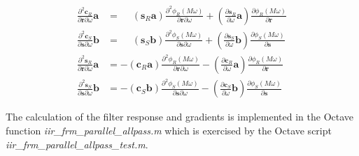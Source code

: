 \documentclass[a4paper,twoside,10pt,english]{report}
\begin{document}
\begin{align*}
\frac{\partial^{2}\boldsymbol{c}_{R}}{\partial\boldsymbol{r}\partial\omega}
\boldsymbol{a}&=
\phantom{-}\left(\boldsymbol{s}_{R}\boldsymbol{a}\right)
\frac{\partial^{2}\phi_{R}\left(M\omega\right)}
{\partial\boldsymbol{r}\partial\omega}
+\left(\frac{\partial\boldsymbol{s}_{R}}{\partial\omega}\boldsymbol{a}\right)
\frac{\partial\phi_{R}\left(M\omega\right)}{\partial\boldsymbol{r}}\\
\frac{\partial^{2}\boldsymbol{c}_{S}}{\partial\boldsymbol{s}\partial\omega}
\boldsymbol{b}&=
\phantom{-}\left(\boldsymbol{s}_{S}\boldsymbol{b}\right)
\frac{\partial^{2}\phi_{S}\left(M\omega\right)}
{\partial\boldsymbol{s}\partial\omega}
+\left(\frac{\partial\boldsymbol{s}_{S}}{\partial\omega}\boldsymbol{b}\right)
\frac{\partial\phi_{S}\left(M\omega\right)}{\partial\boldsymbol{s}}\\
\frac{\partial^{2}\boldsymbol{s}_{R}}{\partial\boldsymbol{r}\partial\omega}
\boldsymbol{a}&= 
-\left(\boldsymbol{c}_{R}\boldsymbol{a}\right)
\frac{\partial^{2}\phi_{R}\left(M\omega\right)}
{\partial\boldsymbol{r}\partial\omega}
-\left(\frac{\partial\boldsymbol{c}_{R}}{\partial\omega}\boldsymbol{a}\right)
\frac{\partial\phi_{R}\left(M\omega\right)}{\partial\boldsymbol{r}}\\
\frac{\partial^{2}\boldsymbol{s}_{S}}{\partial\boldsymbol{s}\partial\omega}
\boldsymbol{b}&=
-\left(\boldsymbol{c}_{S}\boldsymbol{b}\right)
\frac{\partial^{2}\phi_{S}\left(M\omega\right)}
{\partial\boldsymbol{s}\partial\omega}
-\left(\frac{\partial\boldsymbol{c}_{S}}{\partial\omega}\boldsymbol{b}\right)
\frac{\partial\phi_{S}\left(M\omega\right)}{\partial\boldsymbol{s}}
\end{align*}

The calculation of the filter response and gradients is implemented in the 
Octave function \emph{iir\_frm\_parallel\_allpass.m} which is exercised by the 
Octave script \emph{iir\_frm\_parallel\_allpass\_test.m}.
\end{document}
